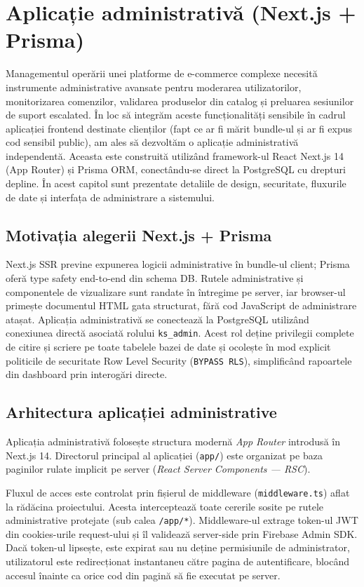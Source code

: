 \chapter{Aplicație administrativă (Next.js + Prisma)}

Managementul operării unei platforme de e-commerce complexe necesită instrumente administrative avansate pentru moderarea utilizatorilor, monitorizarea comenzilor, validarea produselor din catalog și preluarea sesiunilor de suport escalated. În loc să integrăm aceste funcționalități sensibile în cadrul aplicației frontend destinate clienților (fapt ce ar fi mărit bundle-ul și ar fi expus cod sensibil public), am ales să dezvoltăm o aplicație administrativă independentă. Aceasta este construită utilizând framework-ul React Next.js 14 (App Router) și Prisma ORM, conectându-se direct la PostgreSQL cu drepturi depline. În acest capitol sunt prezentate detaliile de design, securitate, fluxurile de date și interfața de administrare a sistemului.

\section{Motivația alegerii Next.js + Prisma}

Next.js SSR previne expunerea logicii administrative în bundle-ul client; Prisma oferă type safety end-to-end din schema DB. Rutele administrative și componentele de vizualizare sunt randate în întregime pe server, iar browser-ul primește documentul HTML gata structurat, fără cod JavaScript de administrare atașat. Aplicația administrativă se conectează la PostgreSQL utilizând conexiunea directă asociată rolului \texttt{ks\_admin}. Acest rol deține privilegii complete de citire și scriere pe toate tabelele bazei de date și ocolește în mod explicit politicile de securitate Row Level Security (\texttt{BYPASS RLS}), simplificând rapoartele din dashboard prin interogări directe.

\section{Arhitectura aplicației administrative}

Aplicația administrativă folosește structura modernă \textit{App Router} introdusă în Next.js 14. Directorul principal al aplicației (\texttt{app/}) este organizat pe baza paginilor rulate implicit pe server (\textit{React Server Components --- RSC}).

Fluxul de acces este controlat prin fișierul de middleware (\texttt{middleware.ts}) aflat la rădăcina proiectului. Acesta interceptează toate cererile sosite pe rutele administrative protejate (sub calea \texttt{/app/*}). Middleware-ul extrage token-ul JWT din cookies-urile request-ului și îl validează server-side prin Firebase Admin SDK. Dacă token-ul lipsește, este expirat sau nu deține permisiunile de administrator, utilizatorul este redirecționat instantaneu către pagina de autentificare, blocând accesul înainte ca orice cod din pagină să fie executat pe server.

